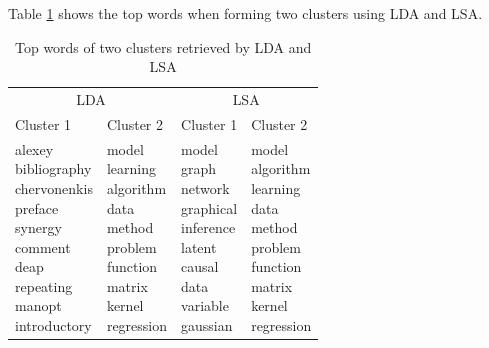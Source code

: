 Table \ref{tab:lda_lsa_topwords} shows the top words when forming two clusters using LDA and LSA.
\begin{table}[]
    \centering
    \caption{Top words of two clusters retrieved by LDA and LSA}
    \begin{tabular}{l|l|l|l}
        \multicolumn{2}{c}{LDA} & \multicolumn{2}{c}{LSA} \\
        Cluster 1 & Cluster 2 & Cluster 1 & Cluster 2\\
        \hline
        \shortstack[l]{alexey \\ bibliography \\ chervonenkis \\ preface \\ synergy \\ comment \\ deap \\ repeating \\ manopt \\ introductory} & \shortstack[l]{model \\ learning \\ algorithm \\ data \\ method \\ problem \\ function \\ matrix \\ kernel \\ regression} & \shortstack[l]{model \\ graph \\ network \\ graphical \\ inference \\ latent \\ causal \\ data \\ variable \\ gaussian} & \shortstack[l]{model \\ algorithm \\ learning \\ data \\ method \\ problem \\ function \\ matrix \\ kernel \\ regression} 
    \end{tabular}
    \label{tab:lda_lsa_topwords}
\end{table}
